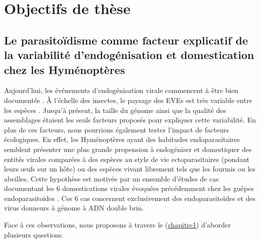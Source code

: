 \chapter{Objectifs de thèse}
{\hypersetup{linkcolor=GREYDARK}\minitoc}
\label{chap:intro-objectifs}

\section{Le parasitoïdisme comme facteur explicatif de la variabilité d'endogénisation et domestication chez les Hyménoptères}

Aujourd'hui, les événements d'endogénisation virale commencent à être bien documentés \citep{ter_horst_endogenous_2019, cheng_nudivirus_2020,kondo_novel_2019,irwin_systematic_2022,li_hgt_2022,flynn_assessing_2019}. À l'échelle des insectes, le paysage des EVEs est très variable entre les espèces \citep{gilbert_diversity_2022}. Jusqu'à présent, la taille du génome ainsi que la qualité des assemblages étaient les seuls facteurs proposés pour expliquer cette variabilité. En plus de ces facteurs, nous pourrions également tester l'impact de facteurs écologiques. En effet, les Hyménoptères ayant des habitudes endoparasitaires semblent présenter une plus grande propension à endogéniser et domestiquer des entités virales comparées à des espèces au style de vie ectoparasitaires (pondant leurs œufs sur un hôte) ou des espèces vivant librement tels que les fourmis ou les abeilles. Cette hypothèse est motivée par un ensemble d'études de cas documentant les 6 domestications virales évoquées précédemment chez les guêpes endoparasitoïdes \citep{volkoff_analysis_2010,beliveau_genomic_2015-1,pichon_recurrent_2015,burke_rapid_2018,di_giovanni_behavior-manipulating_2020}. Ces 6 cas concernent exclusivement des endoparasitoïdes et des virus donneurs à génome à ADN double brin.

Face à ces observations, nous proposons à travers le (\hyperref[sec:chap1]{chapitre1}) d'aborder plusieurs questions. 

